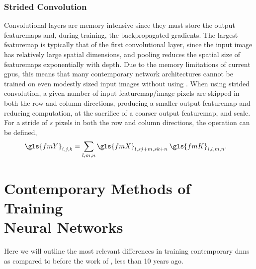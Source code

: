 \documentclass[thesis]{subfiles}
\begin{document}
\subsubsection{Strided Convolution}
Convolutional layers are memory intensive since they must store the output \glspl{featuremap} and, during training, the backpropagated gradients. The largest \gls{featuremap} is typically that of the first convolutional layer, since the input image has relatively large spatial dimensions, and pooling reduces the spatial size of \glspl{featuremap} exponentially with depth. Due to the memory limitations of current \glspl{gpu}, this means that many contemporary network architectures cannot be trained on even modestly sized input images without using . When using strided convolution, a given number of input \gls{featuremap}/image pixels are skipped in both the row and column directions, producing a smaller output \gls{featuremap} and reducing computation, at the sacrifice of a coarser output \gls{featuremap}, and scale. For a \gls{stride} of $s$ pixels in both the row and column directions, the  operation can be defined,
\begin{equation}
	\begin{aligned}
		\gls{fmY}_{i,j,k} &= \sum_{l,m,n} \gls{fmX}_{l,sj+m,sk+n}\: \gls{fmK}_{i,l,m,n}.
	\end{aligned}
\end{equation}

\section[Contemporary Methods of Training Neural Networks]{Contemporary Methods of Training\texorpdfstring{\\}{ }Neural Networks}
\label{section:contemporary}
Here we will outline the most relevant differences in training contemporary \glspl{dnn} as compared to before the work of \citet{Krizhevsky2012}, less than 10 years ago.
\end{document}
